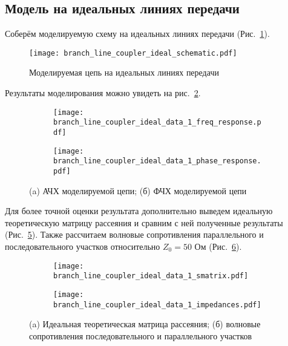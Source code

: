 \subsection{Модель на идеальных линиях передачи}

Соберём моделируемую схему на идеальных линиях передачи (Рис.~\ref{fig:branch_line_coupler_ideal_schematic}).

\begin{figure}[!ht]
    \centering
    \texttt{[image: branch\_line\_coupler\_ideal\_schematic.pdf]}
    \caption{Моделируемая цепь на идеальных линиях передачи}%
    \label{fig:branch_line_coupler_ideal_schematic}
\end{figure}

Результаты моделирования можно увидеть на рис.~\ref{fig:branch_line_coupler_ideal_data_1_freq_response}.

\begin{figure}[!ht]
    \centering
    \begin{subfigure}[b]{0.45\textwidth}
        \centering
        \texttt{[image: branch\_line\_coupler\_ideal\_data\_1\_freq\_response.pdf]}
        \caption{}%
    \label{fig:branch_line_coupler_ideal_data_1_freq_response}
    \end{subfigure}
    \hfill
    \begin{subfigure}[b]{0.45\textwidth}
        \centering
        \texttt{[image: branch\_line\_coupler\_ideal\_data\_1\_phase\_response.pdf]}
        \caption{}%
    \label{fig:branch_line_coupler_ideal_data_1_phase_response}
    \end{subfigure}
    \caption{%
        (a) АЧХ моделируемой цепи;
        (б) ФЧХ моделируемой цепи
    }%
    \label{fig:branch_line_coupler_ideal_data_display_1}
\end{figure}

Для более точной оценки результата дополнительно выведем идеальную теоретическую матрицу рассеяния и сравним с ней полученные результаты (Рис.~\ref{fig:branch_line_coupler_ideal_data_1_smatrix}).
Также рассчитаем волновые сопротивления параллельного и последовательного участков относительно $Z_0 = 50 \text{~Ом}$ (Рис.~\ref{fig:branch_line_coupler_ideal_data_1_impedances}).

\begin{figure}[!ht]
    \centering
    \begin{subfigure}[b]{0.7\textwidth}
        \centering
        \texttt{[image: branch\_line\_coupler\_ideal\_data\_1\_smatrix.pdf]}
        \caption{}%
    \label{fig:branch_line_coupler_ideal_data_1_smatrix}
    \end{subfigure}
    \vfill
    \begin{subfigure}[b]{0.7\textwidth}
        \centering
        \texttt{[image: branch\_line\_coupler\_ideal\_data\_1\_impedances.pdf]}
        \caption{}%
    \label{fig:branch_line_coupler_ideal_data_1_impedances}
    \end{subfigure}
    \caption{%
        (a) Идеальная теоретическая матрица рассеяния;
        (б) волновые сопротивления последовательного и параллельного участков
    }%
    \label{fig:branch_line_coupler_ideal_data_display_2}
\end{figure}

